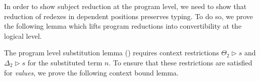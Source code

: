 In order to show subject reduction at the program level, we need to show that reduction of
redexes in dependent positions preserves typing. To do so, we prove the following lemma which
lifts program reductions into convertibility at the logical level.

The program level substitution lemma ()
requires context restrictions $\Theta_2 \triangleright s$ and $\Delta_2 \triangleright s$ for the
substituted term $n$. To ensure that these restrictions are satisfied for \emph{values}, we prove the
following context bound lemma.
